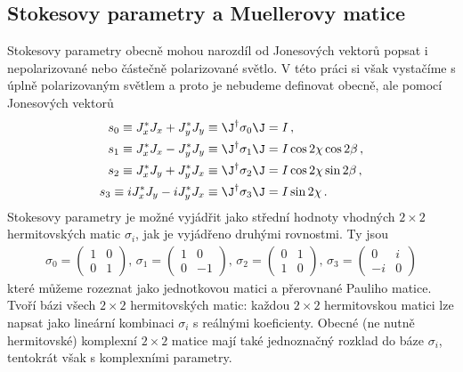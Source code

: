 \subsection{Stokesovy parametry a Muellerovy matice \cite{JonesMueller}} \label{k:stokes}
Stokesovy parametry obecně mohou narozdíl od Jonesových vektorů popsat i nepolarizované nebo částečně polarizované světlo.
V této práci si však vystačíme s úplně polarizovaným světlem a proto je nebudeme definovat obecně, ale pomocí Jonesových vektorů
\begin{align}
s_0 \equiv J_x^* J_x+J_y^* J_y\equiv \J^\dagger \sigma_0 \J &= I \,,\\
s_1 \equiv J_x^* J_x-J_y^* J_y\equiv \J^\dagger \sigma_1 \J &= I \cos 2\chi \cos 2\beta \,,  \\
s_2 \equiv J_x^* J_y+J_y^* J_x\equiv \J^\dagger \sigma_2 \J &= I \cos 2\chi \sin 2\beta \,, \\
s_3 \equiv i J_x^* J_y-i J_y^* J_x  \equiv \J^\dagger \sigma_3 \J &= I \sin 2\chi \,.
\end{align}
Stokesovy parametry je možné vyjádřit jako střední hodnoty vhodných $2\times 2$ hermitovských matic $\sigma_{i}$, jak je vyjádřeno druhými rovnostmi. Ty jsou
\begin{align}
\sigma_0=\begin{pmatrix} 1 & 0 \\ 0 & 1 \end{pmatrix} ,\, 
\sigma_1=\begin{pmatrix} 1 & 0 \\ 0 & -1 \end{pmatrix} ,\,
\sigma_2=\begin{pmatrix} 0 & 1 \\ 1 & 0 \end{pmatrix} ,\, 
\sigma_3=\begin{pmatrix} 0 & i \\ -i & 0 \end{pmatrix} 
\end{align}
které můžeme rozeznat jako jednotkovou matici a přerovnané Pauliho matice. 
Tvoří bázi všech $2\times 2$ hermitovských matic: každou $2\times 2$ hermitovskou matici lze napsat jako lineární kombinaci $\sigma_i$ s reálnými koeficienty.
Obecné (ne nutně hermitovské) komplexní $2\times 2$ matice mají také jednoznačný rozklad do báze $\sigma_i$, tentokrát však s komplexními parametry.

